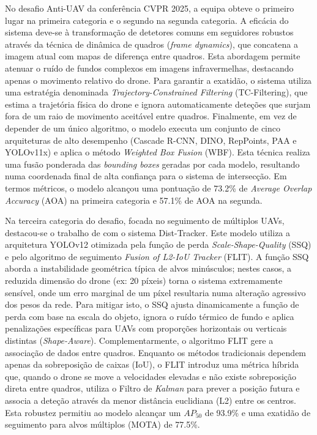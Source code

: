 No desafio Anti-UAV da conferência CVPR 2025, a equipa \cite{1e2CVPR} obteve o primeiro lugar na primeira categoria e o segundo na segunda categoria. A eficácia do sistema deve-se à transformação de detetores comuns em seguidores robustos através da técnica de dinâmica de quadros (\emph{frame dynamics}), que concatena a imagem atual com mapas de diferença entre quadros. Esta abordagem permite atenuar o ruído de fundos complexos em imagens infravermelhas, destacando apenas o movimento relativo do drone. Para garantir a exatidão, o sistema utiliza uma estratégia denominada \emph{Trajectory-Constrained Filtering} (TC-Filtering), que estima a trajetória física do drone e ignora automaticamente deteções que surjam fora de um raio de movimento aceitável entre quadros. Finalmente, em vez de depender de um único algoritmo, o modelo executa um conjunto de cinco arquiteturas de alto desempenho (Cascade R-CNN, DINO, RepPoints, PAA e YOLOv11x) e aplica o método \emph{Weighted Box Fusion} (WBF). Esta técnica realiza uma fusão ponderada das \emph{bounding boxes} geradas por cada modelo, resultando numa coordenada final de alta confiança para o sistema de intersecção. Em termos métricos, o modelo alcançou uma pontuação de 73.2\% de \emph{Average Overlap Accuracy} (AOA) na primeira categoria e 57.1\% de AOA na segunda.

Na terceira categoria do desafio, focada no seguimento de múltiplos UAVs, destacou-se o trabalho de \cite{Dist-track_3CVPR} com o sistema Dist-Tracker. Este modelo utiliza a arquitetura YOLOv12 otimizada pela função de perda \emph{Scale-Shape-Quality} (SSQ) e pelo algoritmo de seguimento \emph{Fusion of L2-IoU Tracker} (FLIT). A função SSQ aborda a instabilidade geométrica típica de alvos minúsculos; nestes casos, a reduzida dimensão do drone (ex: 20 píxeis) torna o sistema extremamente sensível, onde um erro marginal de um píxel resultaria numa alteração agressivo dos pesos da rede. Para mitigar isto, o SSQ ajusta dinamicamente a função de perda com base na escala do objeto, ignora o ruído térmico de fundo e aplica penalizações específicas para UAVs com proporções horizontais ou verticais distintas (\emph{Shape-Aware}). Complementarmente, o algoritmo FLIT gere a associação de dados entre quadros. Enquanto os métodos tradicionais dependem apenas da sobreposição de caixas (IoU), o FLIT introduz uma métrica híbrida que, quando o drone se move a velocidades elevadas e não existe sobreposição direta entre quadros, utiliza o Filtro de \emph{Kalman} para prever a posição futura e associa a deteção através da menor distância euclidiana (L2) entre os centros. Esta robustez permitiu ao modelo alcançar um $AP_{50}$ de 93.9\% e uma exatidão de seguimento para alvos múltiplos (MOTA) de 77.5\%.

